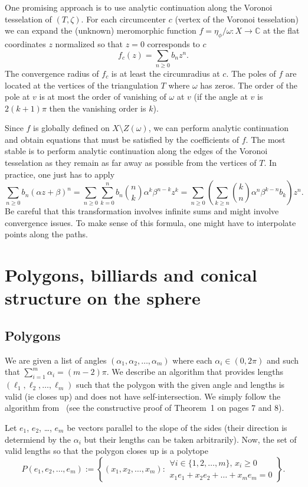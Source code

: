\documentclass[a4paper,12pt]{article}
\def\bC{\mathbb{C}}
\begin{document}
One promising approach is to use analytic continuation along the Voronoi
tesselation of $(T, \zeta)$. For each circumcenter $c$ (vertex of the Voronoi tesselation)
we can expand the (unknown) meromorphic function $f = \eta_\phi / \omega: X \to \bC$ at the
flat coordinates $z$ normalized so that $z=0$ corresponds to $c$
\begin{equation}
f_c(z) = \sum_{n \geq 0} b_n z^n.
\end{equation}
The convergence radius of $f_c$ is at least the circumradius at $c$.
The poles of $f$ are located at the vertices of the triangulation $T$ where
$\omega$ has zeros. The order of the pole at $v$ is at most the order of vanishing
of $\omega$ at $v$ (if the angle at $v$ is $2 (k+1) \pi$ then the vanishing
order is $k$).

Since $f$ is globally defined on $X \setminus Z(\omega)$, we can perform
analytic continuation and obtain equations that must be satisfied by
the coefficients of $f$. The most stable is to perform
analytic continuation along the edges of the Voronoi tesselation as they
remain as far away as possible from the vertices of $T$. In practice, one
just has to apply
\[
\sum_{n \geq 0} b_n (\alpha z + \beta)^n
=
\sum_{n \geq 0} \sum_{k=0}^n b_n \binom{n}{k} \alpha^k \beta^{n-k} z^k
=
\sum_{n \geq 0} \left( \sum_{k \geq n} \binom{k}{n} \alpha^n \beta^{k-n} b_k \right) z^n.
\]
Be careful that this transformation involves infinite sums and might involve
convergence issues. To make sense of this formula, one might have to interpolate
points along the paths.

\section{Polygons, billiards and conical structure on the sphere}

\subsection{Polygons}
We are given a list of angles $(\alpha_1, \alpha_2, \ldots, \alpha_m)$ where each
$\alpha_i \in (0,2\pi)$ and such that $\sum_{i=1}^m \alpha_i = (m-2) \pi$. We describe
an algorithm that provides lengths $(\ell_1, \ell_2, \ldots, \ell_m)$ such that
the polygon with the given angle and lengths is valid (ie closes up) and does not have
self-intersection. We simply follow the algorithm from~\cite{EfratFulekKobourovToth} (see the constructive proof of Theorem~1 on pages 7 and 8).

Let $e_1$, $e_2$, \ldots, $e_m$ be vectors parallel to the slope of the sides
(their direction is determiend by the $\alpha_i$ but their lengths can be taken
arbitrarily). Now, the set of valid lengths so that the polygon closes up is a
polytope
\[
P(e_1, e_2, \ldots, e_m) := \left\{(x_1, x_2, \ldots, x_m):
\begin{array}{l}
\forall i \in \{1,2,\ldots,m\},\, x_i \geq 0 \\
x_1 e_1 + x_2 e_2 + \ldots + x_m e_m = 0
\end{array}
\right\}.
\]
\end{document}
